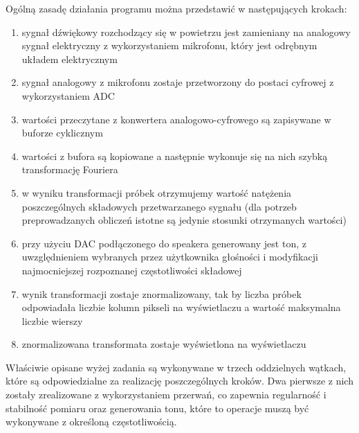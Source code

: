 Ogólną zasadę działania programu można przedstawić w następujących krokach:
\begin{enumerate}
    \item sygnał dźwiękowy rozchodzący się w powietrzu jest zamieniany na analogowy sygnał elektryczny z wykorzystaniem mikrofonu, który jest odrębnym układem elektrycznym
    \item sygnał analogowy z mikrofonu zostaje przetworzony do postaci cyfrowej z wykorzystaniem ADC
    \item wartości przeczytane z konwertera analogowo-cyfrowego są zapisywane w buforze cyklicznym
    \item wartości z bufora są kopiowane a następnie wykonuje się na nich szybką transformację Fouriera
    \item w wyniku transformacji próbek otrzymujemy wartość natężenia poszczególnych składowych przetwarzanego sygnału (dla potrzeb preprowadzanych obliczeń istotne są jedynie stosunki otrzymanych wartości)
    \item przy użyciu DAC podłączonego do speakera generowany jest ton, z uwzględnieniem wybranych przez użytkownika głośności i modyfikacji najmocniejszej rozpoznanej częstotliwości składowej
    \item wynik transformacji zostaje znormalizowany, tak by liczba próbek odpowiadała liczbie kolumn pikseli na wyświetlaczu a wartość maksymalna liczbie wierszy
    \item znormalizowana transformata zostaje wyświetlona na wyświetlaczu
\end{enumerate}

Właściwie opisane wyżej zadania są wykonywane w trzech oddzielnych wątkach, które są odpowiedzialne za realizację poszczególnych kroków. Dwa pierwsze z nich zostały zrealizowane z wykorzystaniem przerwań, co zapewnia regularność i stabilność pomiaru oraz generowania tonu, które to operacje muszą być wykonywane z określoną częstotliwością.

